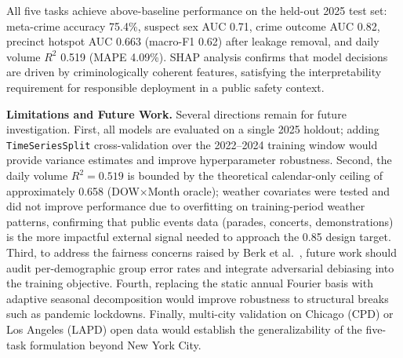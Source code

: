 \documentclass[conference]{IEEEtran}
\begin{document}
All five tasks achieve above-baseline performance on the held-out 2025 test set: meta-crime accuracy 75.4\%, suspect sex AUC 0.71, crime outcome AUC 0.82, precinct hotspot AUC 0.663 (macro-F1 0.62) after leakage removal, and daily volume $R^2$ 0.519 (MAPE 4.09\%). SHAP analysis confirms that model decisions are driven by criminologically coherent features, satisfying the interpretability requirement for responsible deployment in a public safety context.

\textbf{Limitations and Future Work.} Several directions remain for future investigation. First, all models are evaluated on a single 2025 holdout; adding \texttt{TimeSeriesSplit} cross-validation over the 2022--2024 training window would provide variance estimates and improve hyperparameter robustness. Second, the daily volume $R^2 = 0.519$ is bounded by the theoretical calendar-only ceiling of approximately 0.658 (DOW$\times$Month oracle); weather covariates were tested and did not improve performance due to overfitting on training-period weather patterns, confirming that public events data (parades, concerts, demonstrations) is the more impactful external signal needed to approach the 0.85 design target. Third, to address the fairness concerns raised by Berk et al.\ \cite{berk2018}, future work should audit per-demographic group error rates and integrate adversarial debiasing into the training objective. Fourth, replacing the static annual Fourier basis with adaptive seasonal decomposition would improve robustness to structural breaks such as pandemic lockdowns. Finally, multi-city validation on Chicago (CPD) or Los Angeles (LAPD) open data would establish the generalizability of the five-task formulation beyond New York City.
\end{document}
